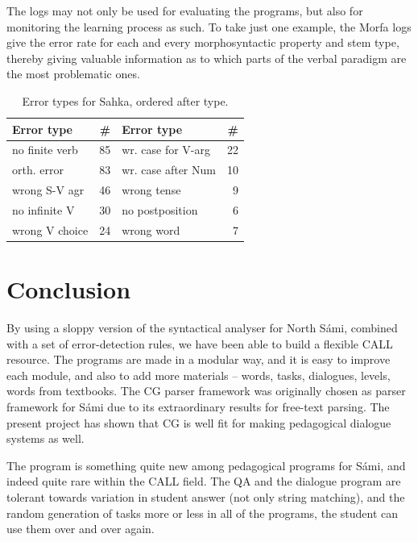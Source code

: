 \documentclass[11pt]{article}
\begin{document}
The logs may not only be used for evaluating the programs, but also for monitoring the learning process as such. To take just one example, the Morfa logs give the error rate for each and every morphosyntactic property and stem type, thereby giving valuable information as to which parts of the verbal paradigm are the most problematic ones.

\begin{table}[htdp]
\caption{Error types for Sahka, ordered after type.}
\begin{center}
\begin{tabular}{|l|r|l|r|}
\hline
Error type & \# & Error type & \# \\
\hline												    
no finite verb    & 85 & wr. case for V-arg & 22  \\
orth. error       & 83 & wr. case after Num & 10 \\
wrong S-V agr     & 46 & wrong tense          & 9 \\
no infinite V  & 30 & no postposition      & 6 \\
wrong V choice & 24 & wrong word           & 7  \\
\hline
\end{tabular}
\end{center}
\label{log2}
\end{table}%

\section{Conclusion}

By using a sloppy version of the syntactical analyser for North Sámi, combined with a set of error-detection rules, we have been able to build a flexible CALL resource. The programs are made in a modular way, and it is easy to improve each module, and also to add more materials -- words, tasks, dialogues, levels, words from textbooks. The CG parser framework was originally chosen as parser framework for Sámi due to its extraordinary results for free-text parsing. The present project has shown that CG is well fit for making pedagogical dialogue systems as well.

The program is something quite new among pedagogical programs for Sámi, and indeed quite rare within the CALL field. %
The QA and the dialogue program are tolerant towards variation in student answer (not only string matching), and the random generation of tasks more or less in all of the programs, the student can use them over and over again. 
\end{document}
